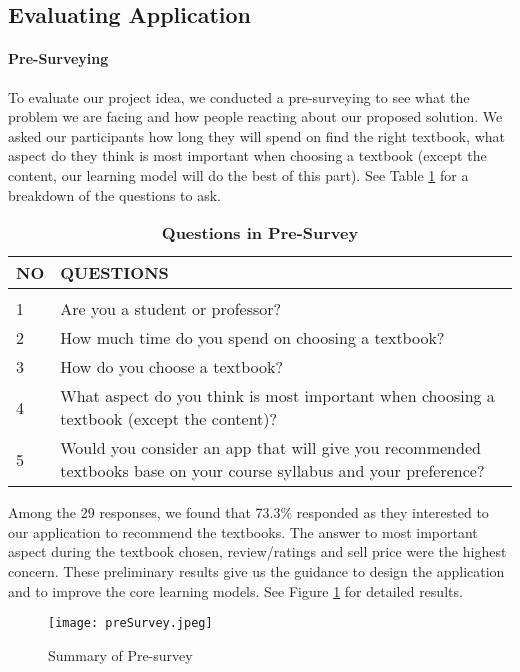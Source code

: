 \subsection{Evaluating Application}
\paragraph{Pre-Surveying}
To evaluate our project idea, we conducted a pre-surveying to see what the problem we are facing and how people reacting about our proposed solution. We asked our participants how long they will spend on find the right textbook, what aspect do they think is most important when choosing a textbook (except the content, our learning model will do the best of this part). See Table \ref{Pre-survey} for a breakdown of the questions to ask.
\begin{table}[!htbp]
\caption{\bf Questions in Pre-Survey} 
\label{Pre-survey}
\begin{center}
\begin{tabular}{  l  p{6cm} }
\bf NO & \bf QUESTIONS\\ \hline \\
1 & Are you a student or professor?\\
2 & How much time do you spend on choosing a textbook?\\
3 & How do you choose a textbook?\\
4 & What aspect do you think is most important when choosing a textbook (except the content)? \\
5 & Would you consider an app that will give you recommended textbooks base on your course syllabus and your preference? \\
\end{tabular} 
\end{center}
\end{table}
Among the 29 responses, we found that 73.3\% responded as they interested to our application to recommend the textbooks. The answer to most important aspect during the textbook chosen, review/ratings and sell price were the highest concern. These preliminary results give us the guidance to design the application and to improve the core learning models. See Figure \ref{result_of_presurvey} for detailed results.

\begin{figure}[ht]
\caption{Summary of Pre-survey}
\label{result_of_presurvey}
\centering
\texttt{[image: preSurvey.jpeg]}
\end{figure}

